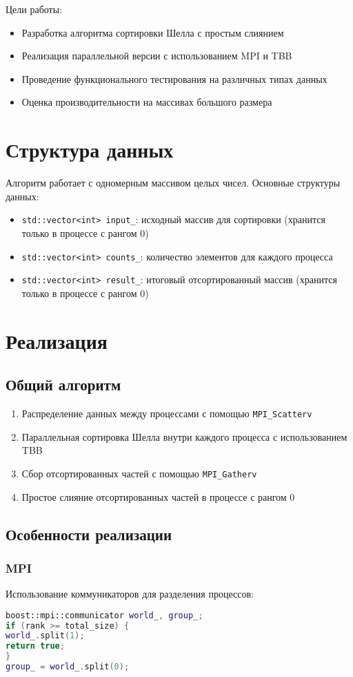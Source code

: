 \documentclass[12pt]{article}
\begin{document}
Цели работы:
\begin{itemize}
\item Разработка алгоритма сортировки Шелла с простым слиянием
\item Реализация параллельной версии с использованием MPI и TBB
\item Проведение функционального тестирования на различных типах данных
\item Оценка производительности на массивах большого размера
\end{itemize}

\section{Структура данных}
Алгоритм работает с одномерным массивом целых чисел. Основные структуры данных:
\begin{itemize}
\item \texttt{std::vector<int> input_}: исходный массив для сортировки (хранится только в процессе с рангом 0)
\item \texttt{std::vector<int> counts_}: количество элементов для каждого процесса
\item \texttt{std::vector<int> result_}: итоговый отсортированный массив (хранится только в процессе с рангом 0)
\end{itemize}

\section{Реализация}
\subsection{Общий алгоритм}
\begin{enumerate}
\item Распределение данных между процессами с помощью \texttt{MPI_Scatterv}
\item Параллельная сортировка Шелла внутри каждого процесса с использованием TBB
\item Сбор отсортированных частей с помощью \texttt{MPI_Gatherv}
\item Простое слияние отсортированных частей в процессе с рангом 0
\end{enumerate}

\subsection{Особенности реализации}
\subsubsection{MPI}
Использование коммуникаторов для разделения процессов:
\begin{lstlisting}[language=C++, caption=Фрагмент кода MPI]
boost::mpi::communicator world_, group_;
if (rank >= total_size) {
world_.split(1);
return true;
}
group_ = world_.split(0);
\end{lstlisting}
\end{document}
